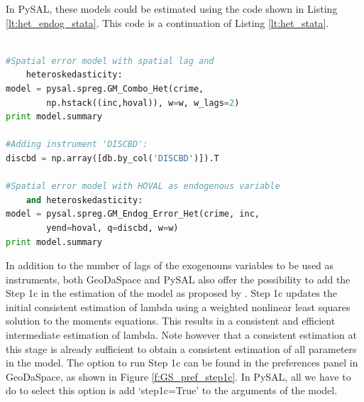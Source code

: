 \documentclass{article}
\begin{document}
In PySAL, these models could be estimated using the code shown in Listing \ref{lt:het_endog_stata}. This code is a continuation of Listing \ref{lt:het_stata}.

\begin{code}
\begin{lstlisting}[label=lt:het_endog_stata,caption=Using PySAL to match the results of spatial error models with heteroskedasticity and endogenous variables or spatial lag from Stata,language=Python]

#Spatial error model with spatial lag and
    heteroskedasticity:
model = pysal.spreg.GM_Combo_Het(crime,
        np.hstack((inc,hoval)), w=w, w_lags=2)
print model.summary

#Adding instrument 'DISCBD':
discbd = np.array([db.by_col('DISCBD')]).T

#Spatial error model with HOVAL as endogenous variable
    and heteroskedasticity:
model = pysal.spreg.GM_Endog_Error_Het(crime, inc,
        yend=hoval, q=discbd, w=w)
print model.summary

\end{lstlisting}
\end{code}

In addition to the number of lags of the exogenouns variables to be used as instruments, both GeoDaSpace and PySAL also offer the possibility to add the Step 1c in the estimation of the model as proposed by \citet{Arraiz10}. Step 1c updates the initial consistent estimation of lambda using a weighted nonlinear least squares solution to the moments equations. This results in a consistent and efficient intermediate estimation of lambda. Note however that a consistent estimation at this stage is already sufficient to obtain a consistent estimation of all parameters in the model. The option to run Step 1c can be found in the preferences panel in GeoDaSpace, as shown in Figure \ref{f:GS_pref_step1c}. In PySAL, all we have to do to select this option is add `step1c=True' to the arguments of the model.
\end{document}
